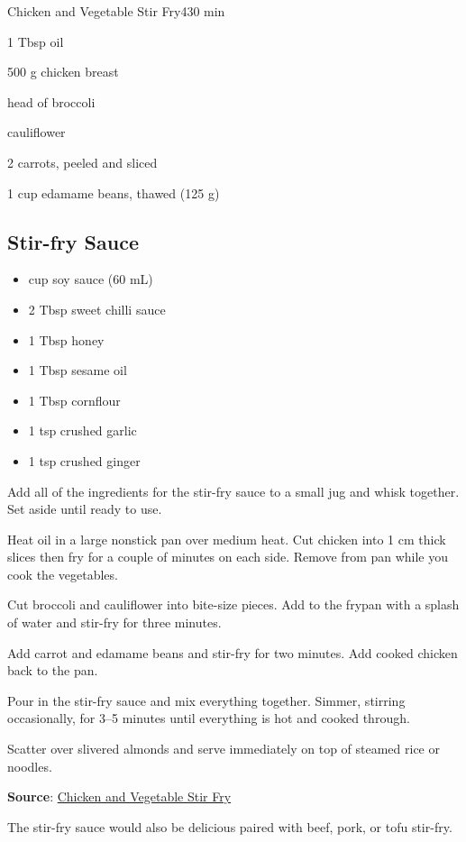 \begin{recipebox}{Chicken and Vegetable Stir Fry}{4}{30 min}
\begin{ingredients}
  \item 1 Tbsp oil
  \item 500 g chicken breast
  \item {} head of broccoli
  \item {} cauliflower
  \item 2 carrots, peeled and sliced
  \item 1 cup edamame beans, thawed (125 g)
\end{ingredients}

\subsection*{Stir-fry Sauce}
\begin{itemize}[leftmargin=2em]
  \item {} cup soy sauce (60 mL)
  \item 2 Tbsp sweet chilli sauce
  \item 1 Tbsp honey
  \item 1 Tbsp sesame oil
  \item 1 Tbsp cornflour
  \item 1 tsp crushed garlic
  \item 1 tsp crushed ginger
\end{itemize}

\begin{method}
  \item Add all of the ingredients for the stir-fry sauce to a small jug and whisk together. Set aside until ready to use.
  \item Heat oil in a large nonstick pan over medium heat. Cut chicken into 1 cm thick slices then fry for a couple of minutes on each side. Remove from pan while you cook the vegetables.
  \item Cut broccoli and cauliflower into bite-size pieces. Add to the frypan with a splash of water and stir-fry for three minutes.
  \item Add carrot and edamame beans and stir-fry for two minutes. Add cooked chicken back to the pan.
  \item Pour in the stir-fry sauce and mix everything together. Simmer, stirring occasionally, for 3–5 minutes until everything is hot and cooked through.
  \item Scatter over slivered almonds and serve immediately on top of steamed rice or noodles.
\end{method}

\textbf{Source}: \href{https://vjcooks.com/chicken-stirfry/#mv-creation-173-jtr}{Chicken and Vegetable Stir Fry}

\begin{notes}
The stir-fry sauce would also be delicious paired with beef, pork, or tofu stir-fry.
\end{notes}
\end{recipebox}